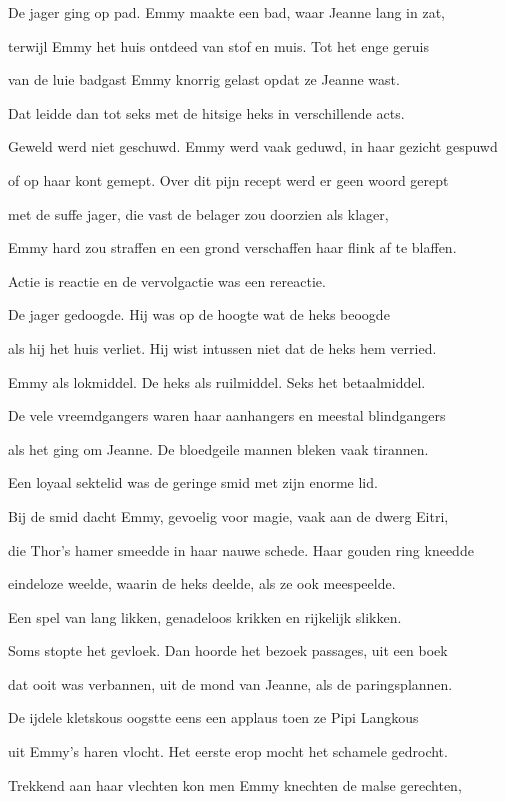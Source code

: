 De jager ging op pad.
Emmy maakte een bad,
waar Jeanne lang in zat,

terwijl Emmy het huis
ontdeed van stof en muis.
Tot het enge geruis

van de luie badgast
Emmy knorrig gelast
opdat ze Jeanne wast.

Dat leidde dan tot seks
met de hitsige heks
in verschillende acts.

Geweld werd niet geschuwd.
Emmy werd vaak geduwd,
in haar gezicht gespuwd

of op haar kont gemept.
Over dit pijn recept
werd er geen woord gerept

met de suffe jager,
die vast de belager
zou doorzien als klager,

Emmy hard zou straffen
en een grond verschaffen
haar flink af te blaffen.

Actie is reactie
en de vervolgactie
was een rereactie.

De jager gedoogde.
Hij was op de hoogte
wat de heks beoogde

als hij het huis verliet.
Hij wist intussen niet
dat de heks hem verried.

Emmy als lokmiddel.
De heks als ruilmiddel.
Seks het betaalmiddel.

De vele vreemdgangers
waren haar aanhangers
en meestal blindgangers

als het ging om Jeanne.
De bloedgeile mannen
bleken vaak tirannen.

Een loyaal sektelid
was de geringe smid
met zijn enorme lid.

Bij de smid dacht Emmy,
gevoelig voor magie,
vaak aan de dwerg Eitri,

die Thor’s hamer smeedde
in haar nauwe schede.
Haar gouden ring kneedde

eindeloze weelde,
waarin de heks deelde,
als ze ook meespeelde.

Een spel van lang likken,
genadeloos krikken
en rijkelijk slikken.

Soms stopte het gevloek.
Dan hoorde het bezoek
passages, uit een boek

dat ooit was verbannen,
uit de mond van Jeanne,
als de paringsplannen.

De ijdele kletskous
oogstte eens een applaus
toen ze Pipi Langkous

uit Emmy’s haren vlocht.
Het eerste erop mocht
het schamele gedrocht.

Trekkend aan haar vlechten
kon men Emmy knechten
de malse gerechten,

